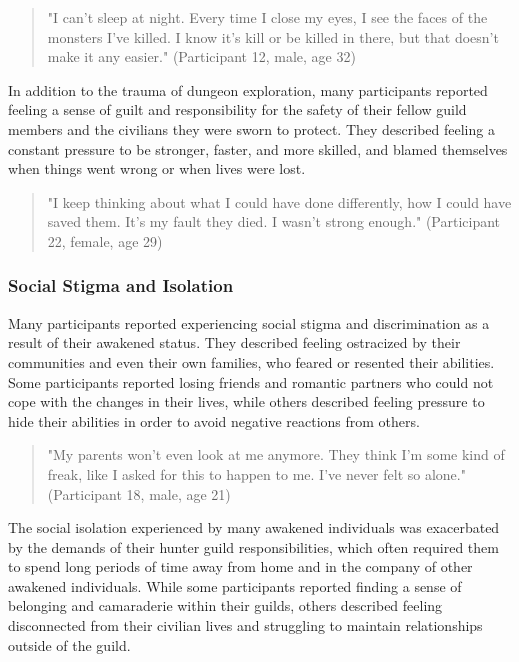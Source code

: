 \documentclass[12pt, a4paper]{article}
\begin{document}
\begin{quote}
    "I can't sleep at night. Every time I close my eyes, I see the faces of the monsters I've killed. I know it's kill or be killed in there, but that doesn't make it any easier." (Participant 12, male, age 32)
\end{quote}

In addition to the trauma of dungeon exploration, many participants reported feeling a sense of guilt and responsibility for the safety of their fellow guild members and the civilians they were sworn to protect. They described feeling a constant pressure to be stronger, faster, and more skilled, and blamed themselves when things went wrong or when lives were lost.

\begin{quote}
    "I keep thinking about what I could have done differently, how I could have saved them. It's my fault they died. I wasn't strong enough." (Participant 22, female, age 29)
\end{quote}

\subsubsection{Social Stigma and Isolation}
Many participants reported experiencing social stigma and discrimination as a result of their awakened status. They described feeling ostracized by their communities and even their own families, who feared or resented their abilities. Some participants reported losing friends and romantic partners who could not cope with the changes in their lives, while others described feeling pressure to hide their abilities in order to avoid negative reactions from others.

\begin{quote}
    "My parents won't even look at me anymore. They think I'm some kind of freak, like I asked for this to happen to me. I've never felt so alone." (Participant 18, male, age 21)
\end{quote}

The social isolation experienced by many awakened individuals was exacerbated by the demands of their hunter guild responsibilities, which often required them to spend long periods of time away from home and in the company of other awakened individuals. While some participants reported finding a sense of belonging and camaraderie within their guilds, others described feeling disconnected from their civilian lives and struggling to maintain relationships outside of the guild.
\end{document}
